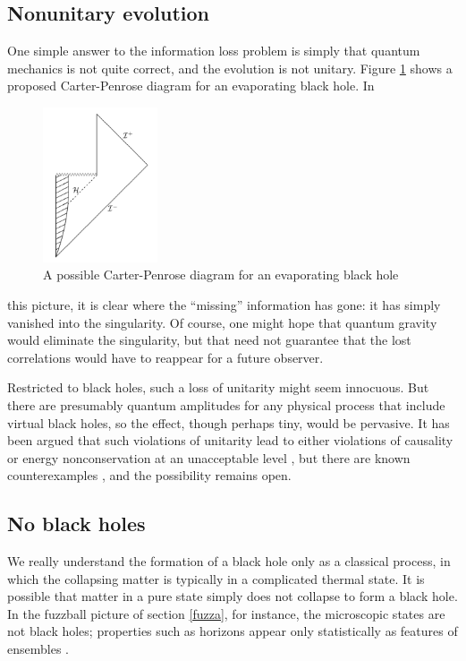 \documentclass[11pt]{article}
\begin{document}
\subsection{Nonunitary evolution}

One simple answer to the information loss problem is simply that 
quantum mechanics is not quite correct, and the evolution is not
unitary.  Figure \ref{Carlipfig5} shows a proposed Carter-Penrose
diagram for an evaporating black hole.  In
\begin{figure}
\centerline{\includegraphics[height=1.8in]{evapbh.pdf}}
\caption{A possible Carter-Penrose diagram for an evaporating black
hole}
\label{Carlipfig5}
\end{figure}
this picture, it is clear where the ``missing'' information has 
gone: it has simply vanished into the singularity.  
Of course, one might hope that quantum gravity would eliminate the
singularity, but that need not guarantee that the lost correlations 
would have to reappear for a future observer.

Restricted to black holes, such a loss of unitarity might seem
innocuous.  But there are presumably quantum amplitudes for any
physical process that include virtual black holes, so the effect,
though perhaps tiny, would be pervasive.  It has been argued that 
such violations of unitarity lead to either violations of causality or 
energy nonconservation at an unacceptable level \cite{Banks}, 
but there are known counterexamples \cite{UnruhWald}, and the 
possibility remains open.

\subsection{No black holes}

We really understand the formation of a black hole only as a 
classical process, in which the collapsing matter is typically in 
a complicated thermal state.  It is possible that matter in a pure
state simply does not collapse to form a black hole.  In the
fuzzball picture of section \ref{fuzza}, for instance, the
microscopic states are not black holes; properties such as
horizons appear only statistically as features of ensembles
\cite{Mathurc}.
\end{document}
